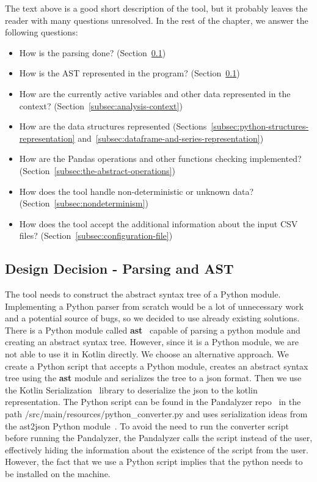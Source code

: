 The text above is a good short description of the tool, but it probably leaves the reader with many questions unresolved.
In the rest of the chapter, we answer the following questions:
\begin{itemize}
    \item How is the parsing done?
    (Section~\ref{subsec:design-decision---parsing-and-ast})
    \item How is the AST represented in the program?
    (Section~\ref{subsec:design-decision---parsing-and-ast})
    \item How are the currently active variables and other data represented in the context?
    (Section~\ref{subsec:analysis-context})
    \item How are the data structures represented
    (Sections~\ref{subsec:python-structures-representation} and~\ref{subsec:dataframe-and-series-representation})
    \item How are the Pandas operations and other functions checking implemented?
    (Section~\ref{subsec:the-abstract-operations})
    \item How does the tool handle non-deterministic or unknown data?
    (Section~\ref{subsec:nondeterminism})
    \item How does the tool accept the additional information about the input CSV files?
    (Section~\ref{subsec:configuration-file})
\end{itemize}

\subsection{Design Decision - Parsing and AST}\label{subsec:design-decision---parsing-and-ast}

The tool needs to construct the abstract syntax tree of a Python module.
Implementing a Python parser from scratch would be a lot of unnecessary work and a potential source of bugs, so we
decided to use already existing solutions.
There is a Python module called \textbf{ast}~\cite{python-ast} capable of parsing a python module and creating an
abstract syntax tree.
However, since it is a Python module, we are not able to use it in Kotlin directly.
We choose an alternative approach.
We create a Python script that accepts a Python module, creates an abstract syntax tree using the \textbf{ast} module
and serializes the tree to a json format.
Then we use the Kotlin Serialization~\cite{kotlin-serialization-guide} library to deserialize the json to the kotlin
representation.
The Python script can be found in the Pandalyzer repo~\cite{pandalyzer} in the path
/src/main/resources/python\_converter.py and uses serialization ideas from the ast2json Python module~\cite{ast2json}.
To avoid the need to run the converter script before running the Pandalyzer, the Pandalyzer calls the script instead of
the user, effectively hiding the information about the existence of the script from the user.
However, the fact that we use a Python script implies that the python needs to be installed on the machine.

